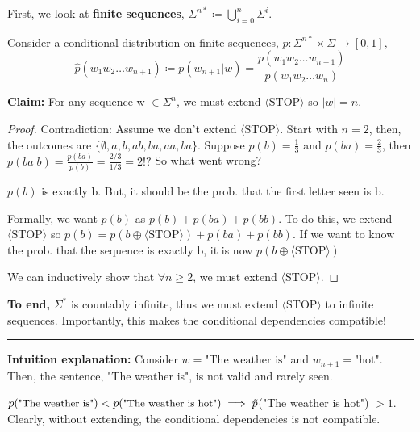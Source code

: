 \documentclass[12pt, twoside]{article}
\begin{document}
\begin{soln}
First, we look at \textbf{finite sequences}, $\Sigma^{n*} \coloneqq \bigcup_{i=0}^{n} \Sigma^i$.

    Consider a conditional distribution on finite sequences, $\hat{p}:\Sigma^{n*} \times \Sigma \to [0,1], $ $$ \hat{p}(w_1w_2\dots
    w_{n+1})\coloneqq p(w_{n+1}|w)=\frac{p(w_1w_2\dots w_{n+1})}{p(w_1w_2 \dots w_{n})}$$

    \textbf{Claim:} For any sequence w $\in \Sigma^n$, we must extend $\langle \text{STOP} \rangle$ so $|w| = n$.
    \vspace{-0.2cm}
    \begin{proof}
        Contradiction: Assume we don't extend $\langle \text{STOP} \rangle$. Start with $n=2$, then, the outcomes are $\{\emptyset, a,b, ab, ba, aa, ba\}$. Suppose $p(b)=\frac{1}{3}$ and $p(ba)=\frac{2}{3}$, then $p(ba|b)= \frac{p(ba)}{p(b)}=\frac{2/3}{1/3}=2 !?$ So what went wrong?

         $p(b)$ is exactly b. But, it should be the prob. that the first letter seen is b.

        Formally, we want $p(b)$ as $p(b) + p(ba) +p(bb)$. To do this, we extend $\langle \text{STOP} \rangle$ so $p(b)=p(b \oplus \langle \text{STOP} \rangle)+p(ba)+p(bb)$. If we want to know the prob. that the sequence is exactly b, it is now $p(b \oplus \langle \text{STOP} \rangle)$

        We can inductively show that $\forall n \geq 2$, we must extend $\langle \text{STOP} \rangle$.
    \end{proof}
        \vspace{-0.2cm}
        \textbf{To end,} $\Sigma^*$ is countably infinite, thus we must extend $\langle \text{STOP} \rangle$ to infinite sequences. Importantly, this makes the conditional dependencies compatible!
    \vspace{0.0005cm}
    \hrule

     \textbf{Intuition explanation:} Consider $w = \text{"The weather is"}$ and $w_{n+1} = \text{"hot"}$. Then, the sentence, "The weather is", is not valid and rarely seen.

    $p(\text{\small"The weather is"}) < p(\text{\small"The weather is hot"}) \implies \tilde{p}$(\small"The weather is hot") $> 1$. \normalsize Clearly, without extending, the conditional dependencies is not compatible.

\end{soln}

\begin{soln}
\end{soln}
\end{document}
